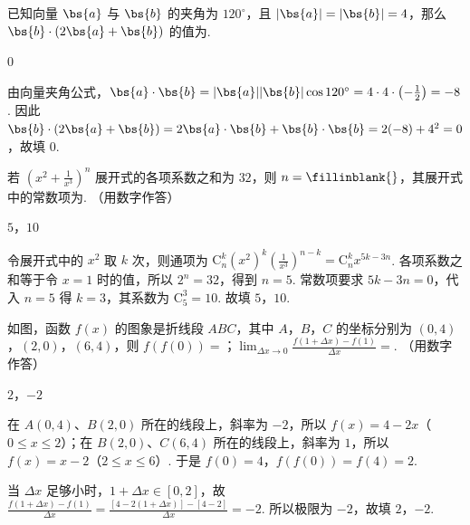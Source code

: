 \begin{problem}
已知向量 \(\bs{a}\) 与 \(\bs{b}\) 的夹角为 \(120^{\circ}\)，且 \(|\bs{a}| = |\bs{b}| = 4\)，那么 \(\bs{b} \cdot (2\bs{a} + \bs{b})\) 的值为\fillinblank{}.

\begin{answer}
\(0\)
\end{answer}

\begin{solution}
由向量夹角公式，\(\bs{a}\cdot\bs{b}=|\bs{a}||\bs{b}|\cos120^{\circ}=4\cdot4\cdot\left(-\frac12\right)=-8\). 因此 \(\bs{b}\cdot(2\bs{a}+\bs{b})=2\bs{a}\cdot\bs{b}+\bs{b}\cdot\bs{b}=2(-8)+4^2=0\)，故填 \(0\).
\end{solution}
\end{problem}

\begin{problem}
若 \(\left(x^{2} + \frac{1}{x^{3}}\right)^{n}\) 展开式的各项系数之和为 \(32\)，则 \(n =\fillinblank{}\)，其展开式中的常数项为\fillinblank{}. （用数字作答）

\begin{answer}
\(5\)，\(10\)
\end{answer}

\begin{solution}
令展开式中的 \(x^2\) 取 \(k\) 次，则通项为 \(\mathrm C_n^k(x^2)^k\left(\frac1{x^3}\right)^{n-k}=\mathrm C_n^k x^{5k-3n}\). 各项系数之和等于令 \(x=1\) 时的值，所以 \(2^n=32\)，得到 \(n=5\). 常数项要求 \(5k-3n=0\)，代入 \(n=5\) 得 \(k=3\)，其系数为 \(\mathrm C_5^3=10\). 故填 \(5\)，\(10\).
\end{solution}
\end{problem}

\begin{problem}
如图，函数 \( f(x) \) 的图象是折线段 \(ABC\)，其中 \(A\)，\(B\)，\(C\) 的坐标分别为 \((0,4)\)，\((2,0)\)，\((6,4)\)，则 \( f(f(0)) = \)\fillinblank{}；\(\displaystyle\lim_{\Delta x \to 0} \frac{f(1 + \Delta x) - f(1)}{\Delta x} = \)\fillinblank{}. （用数字作答）


\begin{answer}
\(2\)，\(-2\)
\end{answer}

\begin{solution}
在 \(A(0,4)\)、\(B(2,0)\) 所在的线段上，斜率为 \(-2\)，所以 \(f(x)=4-2x\)（\(0\leqslant x\leqslant2\)）；在 \(B(2,0)\)、\(C(6,4)\) 所在的线段上，斜率为 \(1\)，所以 \(f(x)=x-2\)（\(2\leqslant x\leqslant6\)）. 于是 \(f(0)=4\)，\(f(f(0))=f(4)=2\).

当 \(\Delta x\) 足够小时，\(1+\Delta x\in[0,2]\)，故 \(\frac{f(1+\Delta x)-f(1)}{\Delta x}=\frac{[4-2(1+\Delta x)]-[4-2]}{\Delta x}=-2\). 所以极限为 \(-2\)，故填 \(2\)，\(-2\).
\end{solution}
\end{problem}

